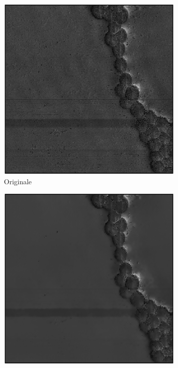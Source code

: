 \documentclass[../main.tex]{subfiles}
\begin{document}
	\begin{figure}[ht]
		\centering
		\begin{subfigure}{0.32\linewidth}
			\includegraphics[keepaspectratio, width=\linewidth]{images/sa_o2a.png}
			\caption{Originale}
		\end{subfigure}
		\begin{subfigure}{0.32\linewidth}
			\includegraphics[keepaspectratio, width=\linewidth]{images/nlm_0025.png}

\end{subfigure}
\end{figure}
\end{document}

